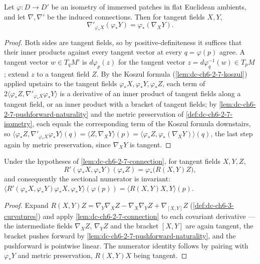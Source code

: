 \begin{lemma}
  \label{lem:dc-ch6-2-7-connection}
  \leanok
  Let $\varphi:D\to D'$ be an isometry of immersed patches in flat Euclidean
  ambients, and let $\nabla,\nabla'$ be the induced connections. Then for
  tangent fields $X,Y$,
  $$
  \nabla'_{\varphi_*X}(\varphi_*Y)=\varphi_*(\nabla_XY).
  $$
\end{lemma}
\begin{proof}
  \leanok
  Both sides are tangent fields, so by positive-definiteness it suffices that
  their inner products against every tangent vector at every $q=\varphi(p)$
  agree. A tangent vector $w\in T_qM'$ is $d\varphi_p(z)$ for the tangent
  vector $z=d\varphi^{-1}_q(w)\in T_pM$; extend $z$ to a tangent field $Z$.
  By the Koszul formula (\cref{lem:dc-ch6-2-7-koszul}) applied upstairs to
  the tangent fields $\varphi_*X,\varphi_*Y,\varphi_*Z$, each term of
  $2\langle\varphi_*Z,\nabla'_{\varphi_*X}\varphi_*Y\rangle$ is a
  derivative of an inner product of tangent fields along a tangent field, or
  an inner product with a bracket of tangent fields; by
  \cref{lem:dc-ch6-2-7-pushforward-naturality} and the metric preservation of
  \cref{def:dc-ch6-2-7-isometry}, each equals the corresponding term of the
  Koszul formula downstairs, so
  $\langle\varphi_*Z,\nabla'_{\varphi_*X}\varphi_*Y\rangle(q)
    =\langle Z,\nabla_XY\rangle(p)
    =\langle\varphi_*Z,\varphi_*(\nabla_XY)\rangle(q)$,
  the last step again by metric preservation, since $\nabla_XY$ is tangent.
\end{proof}

\begin{lemma}
  \label{lem:dc-ch6-2-7-curvature}
  \leanok
  Under the hypotheses of \cref{lem:dc-ch6-2-7-connection}, for tangent fields
  $X,Y,Z$,
  $$
  R'(\varphi_*X,\varphi_*Y)(\varphi_*Z)=\varphi_*\bigl(R(X,Y)Z\bigr),
  $$
  and consequently the sectional numerator is invariant:
  $\langle R'(\varphi_*X,\varphi_*Y)\varphi_*X,\varphi_*Y\rangle(\varphi(p))
    =\langle R(X,Y)X,Y\rangle(p)$.
\end{lemma}
\begin{proof}
  \leanok
  Expand $R(X,Y)Z=\nabla_Y\nabla_XZ-\nabla_X\nabla_YZ+\nabla_{[X,Y]}Z$
  (\cref{def:dc-ch6-3-curvatures}) and apply
  \cref{lem:dc-ch6-2-7-connection} to each covariant derivative — the
  intermediate fields $\nabla_XZ$, $\nabla_YZ$ and the bracket $[X,Y]$ are
  again tangent, the bracket pushes forward by
  \cref{lem:dc-ch6-2-7-pushforward-naturality}, and the pushforward is
  pointwise linear. The numerator identity follows by pairing with
  $\varphi_*Y$ and metric preservation, $R(X,Y)X$ being tangent.
\end{proof}

